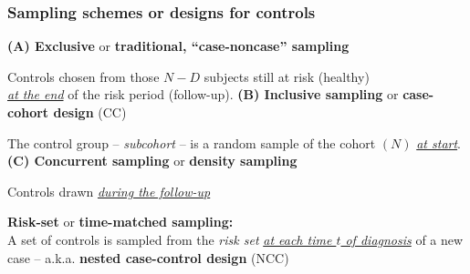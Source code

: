 \documentclass[12pt,dvipsnames,t,handout%
,aspectratio=169%
]{beamer}
\begin{document}

\begin{frame}
\frametitle{\large Sampling schemes or designs for controls}

\pause
\medskip
{\bf (A) Exclusive} or {\bf traditional, ``case-noncase'' sampling}
           \bi
           \item
           Controls chosen from those $N-D$ 
           subjects still at risk (healthy) \\
    \underline{\it at the end}
				    of the risk period (follow-up). 
	     \ei 
	     \pause  
{\bf (B) Inclusive sampling} or {\bf case-cohort design} (CC)
	     \bi
\item The control group -- {\it subcohort} -- 
           is a random sample of the cohort $(N)$  
\underline{\it at start}. %
    \ei
    \pause
{\bf (C) Concurrent sampling} or {\bf density sampling}  
          \bi 
           \item  
           Controls drawn 
            \underline{\it during the follow-up}
           \pause 
           \medskip
           \item {\bf Risk-set} or {\bf time-matched sampling:} \\
         A set of controls is sampled from
         the {\it risk set} 
			  \underline{\it at each time $t$ of diagnosis}
                           of a new case 
         \pause                  
         -- a.k.a. \textbf{nested case-control design} (NCC)                
	     \ei
    
\end{frame}
\end{document}
